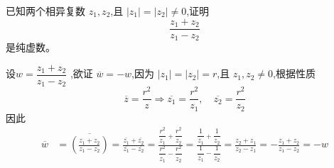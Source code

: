 \begin{questions}
    \question 已知两个相异复数 \(z_1,z_2\),且 \(|z_1|=|z_2|\ne 0\),证明
    \[
    \frac{z_1+z_2}{z_1-z_2}
    \]
    是纯虚数。  
    \begin{solution}
        设$w = \dfrac{z_1 + z_2}{z_1 - z_2}$ ,欲证 \(\overline{w} = -w\),因为 \(|z_1| = |z_2| = r\),且 \(z_1, z_2 \ne 0\),根据性质
        \[
        \overline{z} = \frac{r^2}{z}
        \Rightarrow \overline{z_1} = \frac{r^2}{z_1},\quad \overline{z_2} = \frac{r^2}{z_2}
        \]
        因此
        \begin{align*}
        \overline{w} 
        &= \overline{\left(\frac{z_1 + z_2}{z_1 - z_2}\right)} 
        = \frac{\overline{z_1} + \overline{z_2}}{\overline{z_1} - \overline{z_2}} 
        = \frac{\dfrac{r^2}{z_1} + \dfrac{r^2}{z_2}}{\dfrac{r^2}{z_1} - \dfrac{r^2}{z_2}} 
        = \frac{\dfrac{1}{z_1} + \dfrac{1}{z_2}}{\dfrac{1}{z_1} - \dfrac{1}{z_2}} 
        = \frac{z_2 + z_1}{z_2 - z_1} = -\frac{z_1 + z_2}{z_1 - z_2} = -w
        \end{align*}
    \end{solution}
    
        
    
        

\end{questions}
